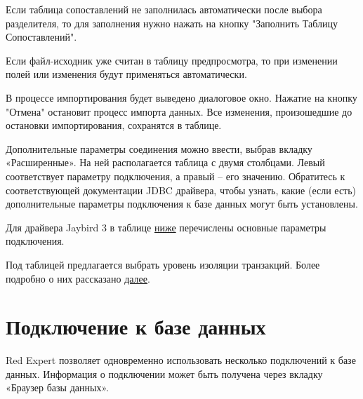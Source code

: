 Если таблица сопоставлений не заполнилась автоматически после выбора разделителя, то для заполнения нужно нажать на кнопку "Заполнить Таблицу Сопоставлений".	

Если файл-исходник уже считан в таблицу предпросмотра, то при изменении полей  или  изменения будут применяться автоматически.

В процессе импортирования будет выведено диалоговое окно. Нажатие на кнопку "Отмена" остановит процесс импорта данных. Все изменения, произошедшие до остановки импортирования, сохранятся в таблице.


Дополнительные параметры соединения можно ввести, выбрав вкладку «Расширенные». На ней располагается таблица с двумя столбцами. Левый соответствует параметру подключения, а правый -- его значению. Обратитесь к соответствующей документации JDBC драйвера, чтобы узнать, какие (если есть) дополнительные параметры подключения к базе данных могут быть установлены.

Для драйвера Jaybird 3 в таблице \hyperlink{tab:01}{ниже} перечислены основные параметры подключения.

Под таблицей предлагается выбрать уровень изоляции транзакций. Более подробно о них рассказано \hyperlink{tab:isollevel}{далее}.

\newpage
\section{Подключение к базе данных}\label{sec:connections}

Red Expert позволяет одновременно использовать несколько подключений к базе данных. Информация о подключении может быть получена через вкладку «Браузер базы данных».



